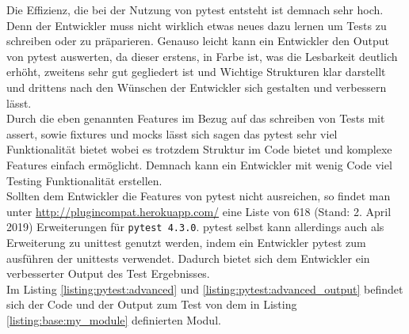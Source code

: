 Die Effizienz, die bei der Nutzung von pytest entsteht ist demnach sehr hoch. Denn der Entwickler
muss nicht wirklich etwas neues dazu lernen um Tests zu schreiben oder zu präparieren. Genauso
leicht kann ein Entwickler den Output von pytest auswerten, da dieser erstens, in Farbe ist, was
die Lesbarkeit deutlich erhöht, zweitens sehr gut gegliedert ist und Wichtige Strukturen klar
darstellt und drittens nach den Wünschen der Entwickler sich gestalten und verbessern lässt.
\newline
\\
Durch die eben genannten Features im Bezug auf das schreiben von Tests mit assert, sowie
\Glspl{fixture} und \Glspl{mock} lässt sich sagen das pytest sehr viel Funktionalität bietet
wobei es trotzdem Struktur im Code bietet und komplexe Features einfach ermöglicht. Demnach
kann ein Entwickler mit wenig Code viel Testing Funktionalität erstellen.
\newline
\\
Sollten dem Entwickler die Features von pytest nicht ausreichen, so findet man unter
\url{http://plugincompat.herokuapp.com/} eine Liste von 618 (Stand: 2. April 2019) Erweiterungen
für \lstinline{pytest 4.3.0}. pytest selbst kann allerdings auch als Erweiterung zu unittest
genutzt werden, indem ein Entwickler pytest zum ausführen der unittests verwendet. Dadurch bietet
sich dem Entwickler ein verbesserter Output des Test Ergebnisses.
\newline
\\
Im Listing \ref{listing:pytest:advanced} und \ref{listing:pytest:advanced_output} befindet sich der
Code und der Output zum Test von dem in Listing \ref{listing:base:my_module} definierten Modul.